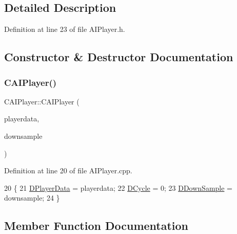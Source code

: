 \subsection{Detailed Description}


Definition at line 23 of file A\+I\+Player.\+h.



\subsection{Constructor \& Destructor Documentation}
\hypertarget{classCAIPlayer_ab8b156d5fdce4d5ecf24624523fe5337}{}\label{classCAIPlayer_ab8b156d5fdce4d5ecf24624523fe5337} 
\subsubsection{\texorpdfstring{C\+A\+I\+Player()}{CAIPlayer()}}
{\footnotesize\ttfamily C\+A\+I\+Player\+::\+C\+A\+I\+Player (\begin{DoxyParamCaption}\item[{std\+::shared\+\_\+ptr$<$ \hyperlink{classCPlayerData}{C\+Player\+Data} $>$}]{playerdata,  }\item[{int}]{downsample }\end{DoxyParamCaption})}



Definition at line 20 of file A\+I\+Player.\+cpp.


\begin{DoxyCode}
20                                                                            \{
21     \hyperlink{classCAIPlayer_a83b5113c8f7e80df54940b647c5ee2e6}{DPlayerData} = playerdata;
22     \hyperlink{classCAIPlayer_adf12a7afe7ea86410b18eff47fa95253}{DCycle} = 0;
23     \hyperlink{classCAIPlayer_a091aed92cb9ad1a789900a6394d2f352}{DDownSample} = downsample;
24 \}
\end{DoxyCode}


\subsection{Member Function Documentation}
\hypertarget{classCAIPlayer_a4216d7e76315234a4fe22fb3a0a89c1d}{}\label{classCAIPlayer_a4216d7e76315234a4fe22fb3a0a89c1d} 
